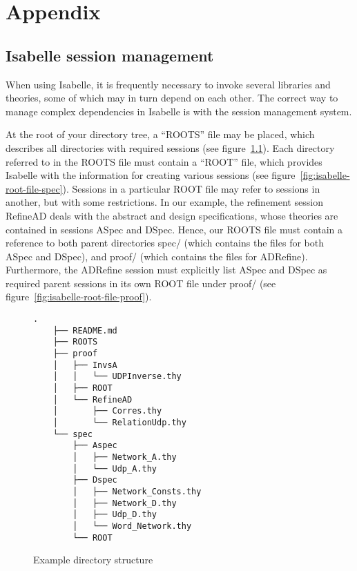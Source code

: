 \documentclass[twoside]{memoir}
\begin{document}
\appendix
\chapter{Appendix}
\section{Isabelle session management}
When using Isabelle, it is frequently necessary to invoke several libraries and theories,
some of which may in turn depend on each other.
The correct way to manage complex dependencies in Isabelle is with the session management system.

At the root of your directory tree, a ``ROOTS'' file may be placed, which describes all directories with required sessions (see figure~\ref{fig:isabelle-roots-file}).
Each directory referred to in the ROOTS file must contain a ``ROOT'' file, which provides Isabelle with the information for creating various sessions
(see figure~\ref{fig:isabelle-root-file-spec}).
Sessions in a particular ROOT file may refer to sessions in another, but with some restrictions.
In our example, the refinement session RefineAD deals with the abstract and design specifications, whose theories are contained in sessions
ASpec and DSpec.
Hence, our ROOTS file must contain a reference to both parent directories spec/ (which contains the files for both ASpec and DSpec), and proof/
(which contains the files for ADRefine).
Furthermore, the ADRefine session must explicitly list ASpec and DSpec as required parent sessions in its own ROOT file under proof/ (see figure~\ref{fig:isabelle-root-file-proof}).

\begin{figure}[htpb]
    \centering
    \begin{lstlisting}[style=tree, language=file]
    .
    ├── README.md
    ├── ROOTS
    ├── proof
    │   ├── InvsA
    │   │   └── UDPInverse.thy
    │   ├── ROOT
    │   └── RefineAD
    │       ├── Corres.thy
    │       └── RelationUdp.thy
    └── spec
        ├── Aspec
        │   ├── Network_A.thy
        │   └── Udp_A.thy
        ├── Dspec
        │   ├── Network_Consts.thy
        │   ├── Network_D.thy
        │   ├── Udp_D.thy
        │   └── Word_Network.thy
        └── ROOT
    \end{lstlisting}
    
    \caption{Example directory structure}
    \label{fig:isabelle-roots-file}
\end{figure}
\end{document}

